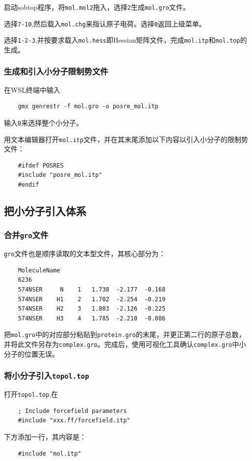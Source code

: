 \documentclass[UTF8, a4paper, 11pt]{ctexart}
\begin{document}
	启动sobtop程序，将\texttt{mol.mol2}拖入，选择\texttt{2}生成\texttt{mol.gro}文件。
	
	选择\texttt{7-10},然后载入\texttt{mol.chg}来指认原子电荷。选择\texttt{0}返回上级菜单。
	
	选择\texttt{1-2-3},并按要求载入\texttt{mol.hess}即Hessian矩阵文件，完成\texttt{mol.itp}和\texttt{mol.top}的生成。
	
	\subsubsection{生成和引入小分子限制势文件}
	在WSL终端中输入
	\begin{lstlisting}
	gmx genrestr -f mol.gro -o posre_mol.itp
	\end{lstlisting}
	输入\texttt{0}来选择整个小分子。
	
	用文本编辑器打开\texttt{mol.itp}文件，并在其末尾添加以下内容以引入小分子的限制势文件：
	\begin{lstlisting}
	#ifdef POSRES
	#include "posre_mol.itp"
	#endif
	\end{lstlisting}
	
	\subsection{把小分子引入体系}
	\subsubsection{合并\texttt{gro}文件}
	\texttt{gro}文件也是顺序读取的文本型文件，其核心部分为：
	\begin{lstlisting}
	MoleculeName
	6236
	574NSER     N    1   1.738  -2.177  -0.168
	574NSER    H1    2   1.702  -2.254  -0.219
	574NSER    H2    3   1.803  -2.126  -0.225
	574NSER    H3    4   1.785  -2.210  -0.086
	\end{lstlisting}
	
	把\texttt{mol.gro}中的对应部分粘贴到\texttt{protein.gro}的末尾，并更正第二行的原子总数，并将此文件另存为\texttt{complex.gro}。完成后，使用可视化工具确认\texttt{complex.gro}中小分子的位置无误。
	
	\subsubsection{将小分子引入\texttt{topol.top}}
	打开\texttt{topol.top},在
	\begin{lstlisting}
	; Include forcefield parameters
	#include "xxx.ff/forcefield.itp"
	\end{lstlisting}
	下方添加一行，其内容是：
	\begin{lstlisting}
	#include "mol.itp"
	\end{lstlisting}
	
\end{document}
